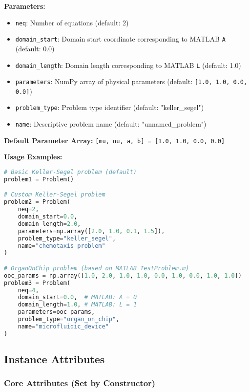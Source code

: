 \textbf{Parameters:}
\begin{itemize}
    \item \texttt{neq}: Number of equations (default: 2)
    \item \texttt{domain\_start}: Domain start coordinate corresponding to MATLAB \texttt{A} (default: 0.0)
    \item \texttt{domain\_length}: Domain length corresponding to MATLAB \texttt{L} (default: 1.0)
    \item \texttt{parameters}: NumPy array of physical parameters (default: \texttt{[1.0, 1.0, 0.0, 0.0]})
    \item \texttt{problem\_type}: Problem type identifier (default: "keller\_segel")
    \item \texttt{name}: Descriptive problem name (default: "unnamed\_problem")
\end{itemize}

\textbf{Default Parameter Array:} \texttt{[mu, nu, a, b] = [1.0, 1.0, 0.0, 0.0]}

\textbf{Usage Examples:}
\begin{lstlisting}[language=Python, caption=Constructor Usage Examples]
# Basic Keller-Segel problem (default)
problem1 = Problem()

# Custom Keller-Segel problem
problem2 = Problem(
    neq=2,
    domain_start=0.0,
    domain_length=2.0,
    parameters=np.array([2.0, 1.0, 0.1, 1.5]),
    problem_type="keller_segel",
    name="chemotaxis_problem"
)

# OrganOnChip problem (based on MATLAB TestProblem.m)
ooc_params = np.array([1.0, 2.0, 1.0, 1.0, 0.0, 1.0, 0.0, 1.0, 1.0])
problem3 = Problem(
    neq=4,
    domain_start=0.0,  # MATLAB: A = 0
    domain_length=1.0, # MATLAB: L = 1
    parameters=ooc_params,
    problem_type="organ_on_chip",
    name="microfluidic_device"
)
\end{lstlisting}

\subsection{Instance Attributes}
\label{subsec:instance_attributes}

\subsubsection{Core Attributes (Set by Constructor)}

